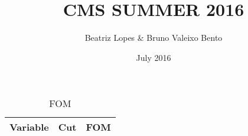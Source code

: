 \documentclass{article}
\title{CMS SUMMER 2016}
\author{Beatriz Lopes &  Bruno Valeixo Bento}
\date{July 2016}
\begin{document}
\maketitle
\begin{table}[!h]
\centering
\begin{tabular}{lll}
\hline
Variable & Cut & FOM\\
\hline
\hline
\end{tabular}
\caption{FOM}
\end{table}
\end{document}
